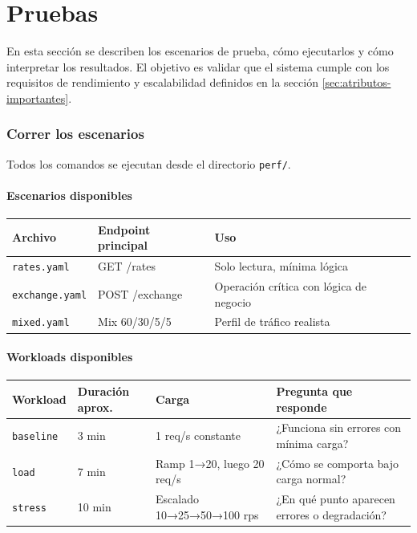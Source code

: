 \section{Pruebas}
\label{sec:pruebas}

En esta sección se describen los escenarios de prueba, cómo ejecutarlos y cómo interpretar los resultados. El objetivo es validar que el sistema cumple con los requisitos de rendimiento y escalabilidad definidos en la sección \ref{sec:atributos-importantes}.

\subsubsection{Correr los escenarios}

Todos los comandos se ejecutan desde el directorio \texttt{perf/}.

\paragraph{Escenarios disponibles}

\begin{table}[H]
\centering
\begin{tabular}{lll}
\toprule
\textbf{Archivo} & \textbf{Endpoint principal} & \textbf{Uso} \\
\midrule
\texttt{rates.yaml} & GET /rates & Solo lectura, mínima lógica \\
\texttt{exchange.yaml} & POST /exchange & Operación crítica con lógica de negocio \\
\texttt{mixed.yaml} & Mix 60/30/5/5 & Perfil de tráfico realista \\
\bottomrule
\end{tabular}
\end{table}

\paragraph{Workloads disponibles}

\begin{table}[H]
\centering
\setlength{\tabcolsep}{8pt}
\begin{tabular}{lllp{5cm}}
\toprule
\textbf{Workload} & \textbf{Duración aprox.} & \textbf{Carga} & \textbf{Pregunta que responde} \\
\midrule
\texttt{baseline} & 3 min & 1 req/s constante & ¿Funciona sin errores con mínima carga? \\
\texttt{load} & 7 min & Ramp 1→20, luego 20 req/s & ¿Cómo se comporta bajo carga normal? \\
\texttt{stress} & 10 min & Escalado 10→25→50→100 rps & ¿En qué punto aparecen errores o degradación? \\
\bottomrule
\end{tabular}
\end{table}

